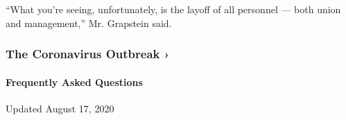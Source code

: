 ``What you're seeing, unfortunately, is the layoff of all personnel ---
both union and management,'' Mr. Grapstein said.

\href{https://www.nytimes3xbfgragh.onion/news-event/coronavirus?action=click\&pgtype=Article\&state=default\&region=MAIN_CONTENT_3\&context=storylines_faq}{}

\hypertarget{the-coronavirus-outbreak-}{%
\subsubsection{The Coronavirus Outbreak
›}\label{the-coronavirus-outbreak-}}

\hypertarget{frequently-asked-questions}{%
\paragraph{Frequently Asked
Questions}\label{frequently-asked-questions}}

Updated August 17, 2020

